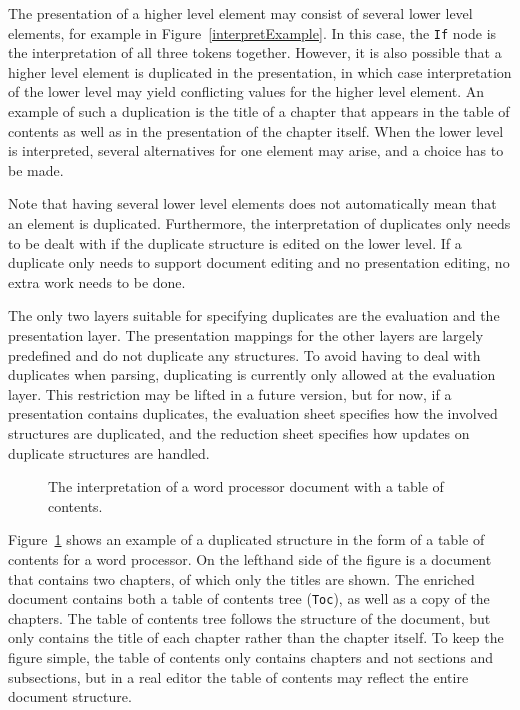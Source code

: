 

The presentation of a higher level element may consist of several lower level elements, for example in Figure~\ref{interpretExample}. In this case, the \verb|If| node is the interpretation of all three tokens together. However, it is also possible that a higher level element is duplicated in the presentation, in which case interpretation of the lower level may yield conflicting values for the higher level element. An example of such a duplication is the title of a chapter that appears in the table of contents as well as in the presentation of the chapter itself. When the lower level is interpreted, several alternatives for one element may arise, and a choice has to be made.

Note that having several lower level elements does not automatically mean that an element is duplicated. Furthermore, the interpretation of duplicates only needs to be dealt with if the duplicate structure is edited on the lower level. If a duplicate only needs to support document editing and no presentation editing, no extra work needs to be done.

The only two layers suitable for specifying duplicates are the evaluation and the presentation layer. The presentation mappings for the other layers are largely predefined and do not duplicate any structures. To avoid having to deal with duplicates when parsing, duplicating is currently only allowed at the evaluation layer. This restriction may be lifted in a future version, but for now, if a presentation contains duplicates, the evaluation sheet specifies how the involved structures are duplicated, and the reduction sheet specifies how updates on duplicate structures are handled.

\begin{figure}
\begin{center}
\begin{center}
%
%
\end{center}
\caption{The interpretation of a word processor document with a table of contents.}\label{duplicatesExample} 
\end{center}
\end{figure}

Figure~\ref{duplicatesExample} shows an example of a duplicated structure in the form of a table of contents for a word processor. On the lefthand side of the figure is a document that contains two chapters, of which only the titles are shown. The enriched document contains both a table of contents tree (\verb|Toc|), as well as a copy of the chapters. The table of contents tree follows the structure of the document, but only contains the title of each chapter rather than the chapter itself. To keep the figure simple, the table of contents only contains chapters and not sections and subsections, but in a real editor the table of contents may reflect the entire document structure. 

